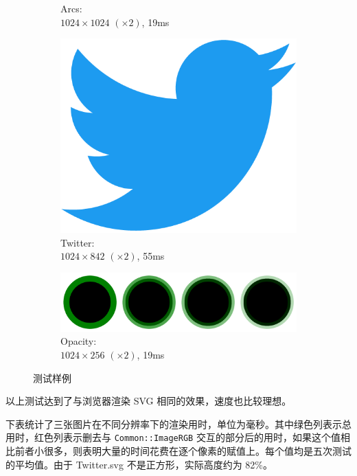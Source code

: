 \documentclass[UTF8]{ctexart}
\begin{document}
\begin{figure}[H]
\begin{subfigure}[b]{0.4\textwidth}
        \caption{Arcs: \\$1024 \times 1024$ $(\times 2)$, 19ms}
    \end{subfigure}
    \hfill
    \begin{subfigure}[b]{0.4\textwidth}
        \centering
        \includegraphics[width=\textwidth]{images/Twitter-1024x842-x2-55ms.png}
        \caption{Twitter: \\$1024 \times 842$ $(\times 2)$, 55ms}
    \end{subfigure}
    \par\bigskip
    \begin{subfigure}[b]{0.6\textwidth}
        \centering
        \includegraphics[width=\textwidth]{images/Opacity-1024x256-x2-19ms.png}
        \caption{Opacity: \\$1024 \times 256$ $(\times 2)$, 19ms}
    \end{subfigure}
    \caption{测试样例}
\end{figure}

以上测试达到了与浏览器渲染 SVG 相同的效果，速度也比较理想。

下表统计了三张图片在不同分辨率下的渲染用时，单位为毫秒。其中\colorbox{color1}{绿色列}表示总用时，\colorbox{color2}{红色列}表示删去与 \texttt{Common::ImageRGB} 交互的部分后的用时，如果这个值相比前者小很多，则表明大量的时间花费在逐个像素的赋值上。每个值均是五次测试的平均值。由于 Twitter.svg 不是正方形，实际高度约为 82\%。
\end{document}
